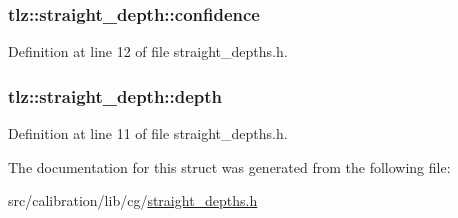 \subsubsection[{\texorpdfstring{confidence}{confidence}}]{ tlz\+::straight\+\_\+depth\+::confidence}\hypertarget{structtlz_1_1straight__depth_a4ba5f192be0e4ca1563c1f6c615ea406}{}\label{structtlz_1_1straight__depth_a4ba5f192be0e4ca1563c1f6c615ea406}


Definition at line 12 of file straight\+\_\+depths.\+h.

\subsubsection[{\texorpdfstring{depth}{depth}}]{ tlz\+::straight\+\_\+depth\+::depth}\hypertarget{structtlz_1_1straight__depth_a7f8f491d5607692e32111b7f6a57b01f}{}\label{structtlz_1_1straight__depth_a7f8f491d5607692e32111b7f6a57b01f}


Definition at line 11 of file straight\+\_\+depths.\+h.



The documentation for this struct was generated from the following file\+:\begin{DoxyCompactItemize}
\item 
src/calibration/lib/cg/\hyperlink{straight__depths_8h}{straight\+\_\+depths.\+h}\end{DoxyCompactItemize}
